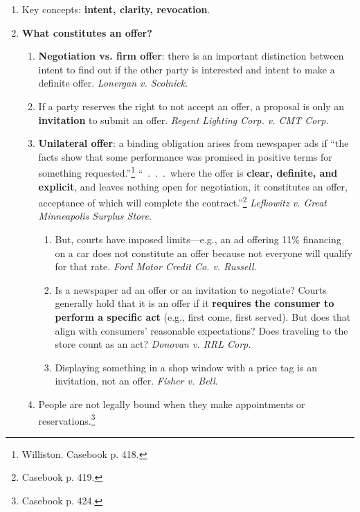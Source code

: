 \begin{enumerate}
    \item Key concepts: \textbf{intent, clarity, revocation}.
    \item \textbf{What constitutes an offer?}
    \begin{enumerate}
        \item \textbf{Negotiation vs. firm offer}: there is an important 
        distinction between intent to find out if the other party is 
        interested and intent to make a definite offer. \emph{Lonergan v. 
        Scolnick}.
        \item If a party reserves the right to not accept an offer, a proposal 
        is only an \textbf{invitation} to submit an offer. \emph{Regent 
        Lighting Corp. v. CMT Corp.}
        \item \textbf{Unilateral offer}: a binding obligation arises from 
        newspaper ads if ``the facts show that some performance was promised 
        in positive terms for something requested.''\footnote{Williston. 
        Casebook p.  418.} ``~.~.~.~where the offer is \textbf{clear, 
        definite, and explicit}, and leaves nothing open for negotiation, it 
        constitutes an offer, acceptance of which will complete the 
        contract.''\footnote{Casebook p.  419.} \emph{Lefkowitz v. Great 
        Minneapolis Surplus Store}.
        \begin{enumerate}
            \item But, courts have imposed limits---e.g., an ad offering 11\% 
            financing on a car does not constitute an offer because not 
            everyone will qualify for that rate. \emph{Ford Motor Credit Co. 
            v. Russell}.
            \item Is a newspaper ad an offer or an invitation to negotiate? 
            Courts generally hold that it is an offer if it \textbf{requires 
            the consumer to perform a specific act} (e.g., first come, first 
            served). But does that align with consumers' reasonable 
            expectations? Does traveling to the store count as an act? 
            \emph{Donovan v. RRL Corp.}
            \item Displaying something in a shop window with a price tag is an 
            invitation, not an offer. \emph{Fisher v. Bell}.
        \end{enumerate}
        \item People are not legally bound when they make appointments or 
        reservations.\footnote{Casebook p. 424.}

\end{enumerate}
\end{enumerate}
